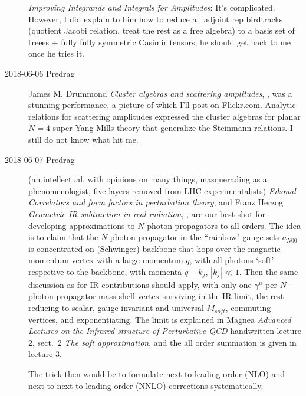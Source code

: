 \begin{description}
{\em Improving Integrands and Integrals for Amplitudes}: It's
complicated. However, I did explain to him how to reduce all adjoint rep
birdtracks (quotient Jacobi relation, treat the rest as a free algebra)
to a basis set of treees + fully fully symmetric Casimir tensors; he
should get back to me once he tries it.

\item[2018-06-06 Predrag]

{James M. Drummond} {\em Cluster algebras and scattering amplitudes},
, was a stunning performance, a picture of which I'll
post on Flickr.com. Analytic relations for scattering amplitudes
expressed the cluster algebras for planar $N=4$ super Yang-Mills theory
that generalize the Steinmann relations.  I still do not know what hit
me.

\item[2018-06-07 Predrag]

 (an intellectual,
with opinions on many things, masquerading as a phenomenologist, five
layers removed from LHC experimentalists) {\em Eikonal Correlators and
form factors in perturbation theory},
and
{Franz Herzog} {\em Geometric IR subtraction in real radiation},
, are our best
shot for developing approximations to $N$-photon propagators to all orders.
The idea is to claim that the $N$-photon propagator in the ``rainbow"
gauge sets $a_{N00}$ is concentrated on (Schwinger) backbone that hops
over the magnetic momentum vertex with a large momentum $q$, with all photons
`soft' respective to the backbone, with momenta $q-k_j$, $|k_j|\ll 1$.
Then the same discussion as for IR contributions should apply, with
only one $\gamma^\mu$ per $N$-photon propagator mass-shell vertex
surviving in the IR limit, the rest reducing to scalar, gauge invariant
and universal $M_{soft}$, commuting
vertices, and exponentiating. The limit is explained in Magnea
{\em Advanced Lectures on the Infrared structure of Perturbative QCD}
handwritten
 {lecture 2},
sect.~2 {\em The soft approximation}, and the all order summation
is given in
 {lecture 3}.

The trick then would be to formulate  next-to-leading order (NLO) and
next-to-next-to-leading order (NNLO) corrections systematically.




\end{description}
